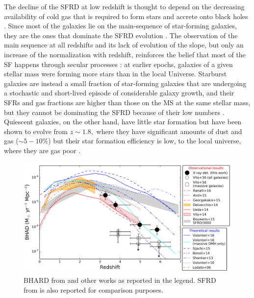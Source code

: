     The decline of the SFRD at low redshift is thought to depend on the decreasing availability of cold gas that is required to form stars and accrete onto black holes \citep[e.g.,][]{2016MNRAS.458L..14F}. Since most of the galaxies lie on the main-sequence of star-forming galaxies, they are the ones that dominate the SFRD evolution \citep{2011ApJ...739L..40R}. The observation of the main sequence at all redshifts and its lack of evolution of the slope, but only an increase of the normalization with redshift, reinforces the belief that most of the SF happens through secular processes \citep{2015A&A...581A..54T, 2015A&A...575A..74S, 2016ApJ...817..118T}: at earlier epochs, galaxies of a given stellar mass were forming more stars than in the local Universe.
    Starburst galaxies are instead a small fraction of star-forming galaxies that are undergoing a stochastic and short-lived episode of considerable galaxy growth, and their SFRs and gas fractions are higher than those on the MS at the same stellar mass, but they cannot be dominating the SFRD because of their low numbers \citep[$\sim2\%$][]{2011ApJ...739L..40R}. 
    Quiescent galaxies, on the other hand, have little star formation but have been shown to evolve from $z\sim1.8,$ where they have significant amounts of dust and gas ($\sim5-10\%$) but their star formation efficiency is low, to the local universe, where they are gas poor \citep{2018NatAs...2..239G}.

\begin{figure}
\begin{center}
  \includegraphics[width=\textwidth]{Figs/BHARD_Vito18.pdf}
  \vspace{-30pt}
  \caption{BHARD from \citet{2018MNRAS.473.2378V} and other works as reported in the legend. SFRD from \citet{2015ApJ...803...34B} is also reported for comparison purposes.}
    \label{fig:AGN_SED}
\end{center}
\end{figure}
    
